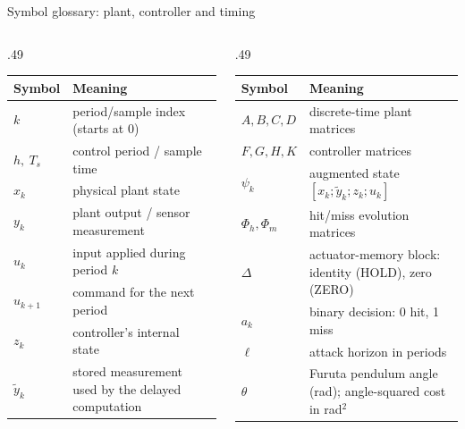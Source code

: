\documentclass[8pt,aspectratio=169]{beamer}
\gdef\CPSOrigin{PAPER}%
\gdef\CPSSourceContext{}%
\newcommand{\src}[1][]{\gdef\CPSSourceContext{#1}}%
\begin{document}
\begin{frame}{Symbol glossary: plant, controller and timing}
\gdef\CPSSourceContext{}
\gdef\CPSOrigin{KEY}
\small\renewcommand{\arraystretch}{1.5}
\begin{columns}[T,onlytextwidth]
\begin{column}{.49\textwidth}
\begin{tabularx}{\linewidth}{@{}lX@{}}
\toprule \textbf{Symbol} & \textbf{Meaning}\\\midrule
$k$ & period/sample index (starts at 0)\\
$h,\ T_s$ & control period / sample time\\
$x_k$ & physical plant state\\
$y_k$ & plant output / sensor measurement\\
$u_k$ & input applied during period $k$\\
$u_{k+1}$ & command for the next period\\
$z_k$ & controller's internal state\\
$\tilde y_k$ & stored measurement used by the delayed computation\\
\bottomrule
\end{tabularx}
\end{column}
\begin{column}{.49\textwidth}
\begin{tabularx}{\linewidth}{@{}lX@{}}
\toprule \textbf{Symbol} & \textbf{Meaning}\\\midrule
$A,B,C,D$ & discrete-time plant matrices\\
$F,G,H,K$ & controller matrices\\
$\psi_k$ & augmented state $[x_k;\tilde y_k;z_k;u_k]$\\
$\Phi_h,\Phi_m$ & hit/miss evolution matrices\\
$\Delta$ & actuator-memory block: identity (HOLD), zero (ZERO)\\
$a_k$ & binary decision: 0 hit, 1 miss\\
$\ell$ & attack horizon in periods\\
$\theta$ & Furuta pendulum angle (rad); angle-squared cost in rad$^2$\\
\bottomrule
\end{tabularx}
\end{column}
\end{columns}
\src[Paper notation; Eqs.~1--7]
\end{frame}
\end{document}
